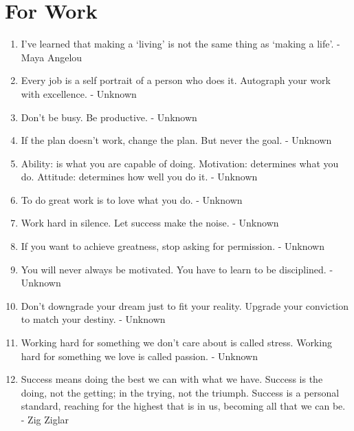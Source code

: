     \section*{For Work}
        \begin{enumerate}
            \item I’ve learned that making a `living' is not the same thing as `making a life'. - Maya Angelou

            \item Every job is a self portrait of a person who does it. Autograph your work with excellence. - Unknown

            \item Don’t be busy. Be productive. - Unknown

            \item If the plan doesn’t work, change the plan. But never the goal. - Unknown

            \item Ability: is what you are capable of doing. Motivation: determines what you do. Attitude: determines how well you do it. - Unknown

            \item To do great work is to love what you do. - Unknown

            \item Work hard in silence. Let success make the noise. - Unknown

            \item If you want to achieve greatness, stop asking for permission. - Unknown

            \item You will never always be motivated. You have to learn to be disciplined. - Unknown

            \item Don’t downgrade your dream just to fit your reality. Upgrade your conviction to match your destiny. - Unknown

            \item Working hard for something we don’t care about is called stress. Working hard for something we love is called passion. - Unknown

            \item Success means doing the best we can with what we have. Success is the doing, not the getting; in the trying, not the triumph. Success is a personal standard, reaching for the highest that is in us, becoming all that we can be. - Zig Ziglar


\end{enumerate}
